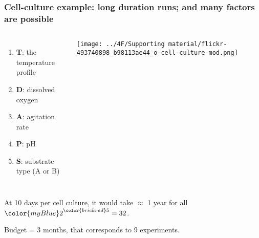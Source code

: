 \documentclass[handout,11pt,aspectratio=169,mathserif]{beamer}
\begin{document}
\begin{frame}\frametitle{Cell-culture example: long duration runs; and many factors are possible}
	\newcommand{\white}{\color{white}}
	\begin{columns}[c]
			\begin{enumerate}
				\item	\textbf{T}: the temperature profile
				\item	\textbf{D}: dissolved oxygen
				\item	\textbf{A}: agitation rate
				\item	\textbf{P}: pH
				\item	\textbf{S}: substrate type (A or B)
			\end{enumerate}
		
			
			\vspace{0.2cm}
			
			\centerline{\texttt{[image: ../4F/Supporting material/flickr-493740898\_b98113ae44\_o-cell-culture-mod.png]}}
	\end{columns}

	\vfill
	At 10 days per cell culture, it would take $\approx$ 1 year for all  ${\color{myBlue} 2}^{\color{brickred} 5} = 32$.
	
	Budget = 3 months, {\color{myOrange} that corresponds to 9 experiments}.
		
\end{frame}
\end{document}
